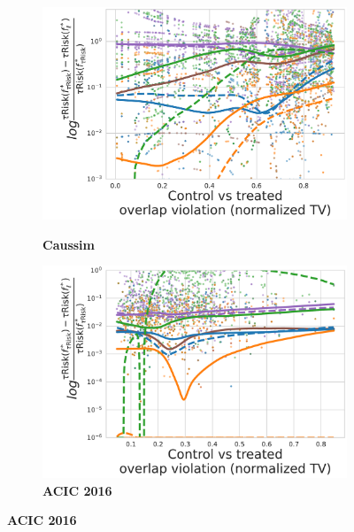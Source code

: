 \documentclass[11pt]{article}
\begin{document}
\begin{appendices}
    \begin{figure}
        \centering
        \begin{subfigure}[b]{0.44\textwidth}
            \centering
            \caption{\textbf{Caussim}}
            \includegraphics[width=\textwidth]{images/normalized_bias_tau_risk_to_best_method_caussim__nuisance_non_linear__candidates_ridge__overlap_01-247.pdf}
            \label{fig:normalized_bias_tau_risk_to_best_method_caussim}
        \end{subfigure}
        \hfill
        \begin{subfigure}[b]{0.44\textwidth}
            \centering
            \caption{\textbf{ACIC 2016}}
            \includegraphics[width=\textwidth]{images/normalized_bias_tau_risk_to_best_method_acic_2016__nuisance_non_linear__candidates_hist_gradient_boosting__dgp_1-77__rs_1-10.pdf}

\end{subfigure}
\end{figure}
\end{appendices}
\end{document}
